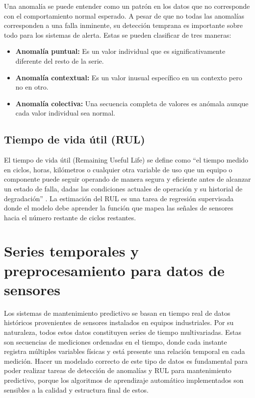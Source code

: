 Una anomalía se puede entender como un patrón en los datos que no corresponde con el comportamiento normal esperado. A pesar de que no todas las anomalías corresponden a una falla inminente, su detección temprana es importante sobre todo para los sistemas de alerta. Estas se pueden clasificar de tres maneras:

\begin{itemize}
    \item \textbf{Anomalía puntual:} Es un valor individual que es significativamente diferente del resto de la serie.
    \item \textbf{Anomalía contextual:} Es un valor inusual específico en un contexto pero no en otro.
    \item \textbf{Anomalía colectiva:} Una secuencia completa de valores es anómala aunque cada valor individual sea normal.
\end{itemize}

\subsection{Tiempo de vida útil (RUL)}

El tiempo de vida útil (Remaining Useful Life) se define como ``el tiempo medido en ciclos, horas, kilómetros o cualquier otra variable de uso que un equipo o componente puede seguir operando de manera segura y eficiente antes de alcanzar un estado de falla, dadas las condiciones actuales de operación y su historial de degradación'' \cite{si2011}. La estimación del RUL es una tarea de regresión supervisada donde el modelo debe aprender la función que mapea las señales de sensores hacia el número restante de ciclos restantes.

\section{Series temporales y preprocesamiento para datos de sensores}

Los sistemas de mantenimiento predictivo se basan en tiempo real de datos históricos provenientes de sensores instalados en equipos industriales. Por su naturaleza, todos estos datos constituyen series de tiempo multivariadas. Estas son secuencias de mediciones ordenadas en el tiempo, donde cada instante registra múltiples variables físicas y está presente una relación temporal en cada medición. Hacer un modelado correcto de este tipo de datos es fundamental para poder realizar tareas de detección de anomalías y RUL para mantenimiento predictivo, porque los algoritmos de aprendizaje automático implementados son sensibles a la calidad y estructura final de estos.

